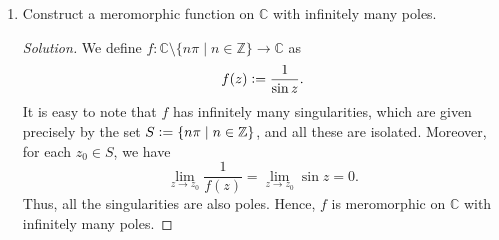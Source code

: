 \documentclass[11pt]{article}
\theoremstyle{definition}
\newenvironment{soln}{\begin{proof}[Solution]}{\end{proof}}
\begin{document}
\begin{enumerate}[leftmargin=*]
\begin{soln}
\begin{enumerate}
        \item This follows the same approach as the first one. All the singularities (and their types) remain the same.
        
        \item Here, we have a problem if $z = 0$ or $\sin(1/z) = 0$. Thus, the set of singularities is given by
        \[
            S = \{0\} \cup \left\{ \frac{1}{n\pi} \mid n \in \mathbb{Z} \setminus \{0\} \right\}.
        \]
        Note that $0$ is not an isolated singularity since every neighbourhood of $0$ contains some point of the form $1/(n\pi)$. We thus do not classify $0$. All other singularities, however, are isolated. To see this, let $z_0 \in S \setminus \{0\}$. Then, \[
            z_0 = \frac{1}{n\pi}
        \]
        for some $n \in \mathbb{Z} \setminus \{0\}$. Now, choose
        \[
            \delta \vcentcolon= \min \left\{ \abs{\frac{1}{n\pi} - \frac{1}{(n+1)\pi}} , \abs{\frac{1}{n\pi} - \frac{1}{(n-1)\pi}}\right\}.
        \]
        (If $n = \pm 1$, then just choose the other value). For the above choice of $\delta$, the punctured neighbourhood $B_{\delta}(z_0) \setminus \{z_0\}$ contains no other point of $S$.
        
        Now, we show that all of these isolated singularities are poles. To see this, we note that
        \[
            \lim_{z \to z_0} \frac{z-z_0}{\sin(1/z)}
        \]
        exists (as a finite number) and is nonzero for any $z_0 \in S \setminus \{0\}$. Thus, all these points are poles.
        
        \item The only problematic point here is $0$. We show that $0$ is an essential singularity. Note that as $z \to 0$ along the negative real axis, we have that $e^{1/z} \to 0$. However, as $z \to 0$ along the positive real axis, we have $e^{1/z} \to \infty$. Thus, $\displaystyle\lim_{z \to 0} e^{1/z}$ does not exist, neither as a finite complex number, nor as $\infty$. 
        \end{enumerate}
        
    \end{soln}
    
    \item Construct a meromorphic function on $\mathbb{C}$ with infinitely many poles.
    
    \begin{soln}
        We define $f \colon \mathbb{C} \setminus \{n\pi \mid n \in \mathbb{Z}\} \to \mathbb{C}$ as
        \[
            f(z) \vcentcolon= \frac{1}{\sin z}.
        \]
        It is easy to note that $f$ has infinitely many singularities, which are given precisely by the set $S \vcentcolon= \{n\pi \mid n \in \mathbb{Z}\}$, and all these are isolated. Moreover, for each $z_0 \in S$, we have
        \[
            \lim_{z \to z_0}\frac{1}{f(z)} = \lim_{z \to z_0} \sin z = 0.
        \]
        Thus, all the singularities are also poles. Hence, $f$ is meromorphic on $\mathbb{C}$ with infinitely many poles. 
    \end{soln}
    

\end{enumerate}
\end{document}
